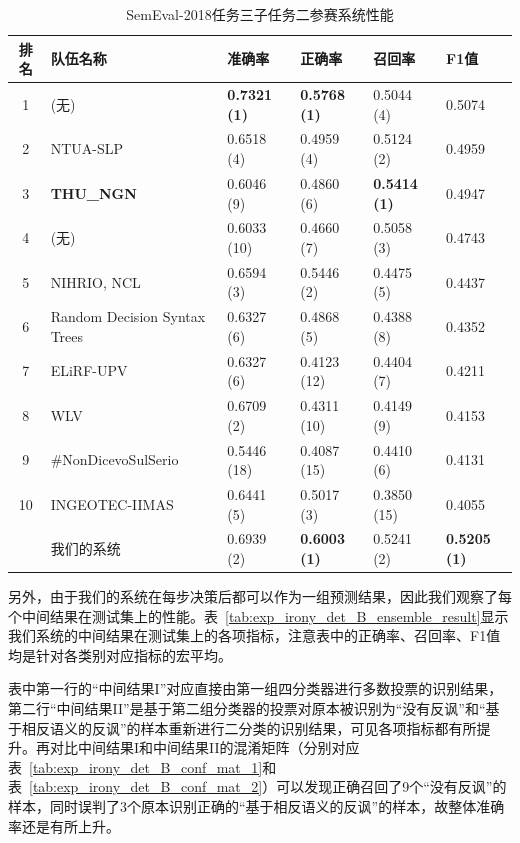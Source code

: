 \begin{table}[htb]
  \centering
  \begin{minipage}[t]{\linewidth}
  \caption{SemEval-2018任务三子任务二参赛系统性能} %
  \label{tab:exp_irony_det_B_other_comp}
    \begin{tabularx}{\linewidth}{c|X|llll}
    \toprule[1.5pt]
    排名 & 队伍名称 & 准确率 & 正确率 & 召回率 & F1值 \\
    \hline 
    1 & (无) & \bf 0.7321 (1) & \bf 0.5768 (1) & 0.5044 (4) & 0.5074 \\
    2 & NTUA-SLP & 0.6518 (4) & 0.4959 (4) & 0.5124 (2) & 0.4959 \\
    3 & \bf THU\_NGN & 0.6046 (9) & 0.4860 (6) & \bf 0.5414 (1) & 0.4947 \\
    4 & (无) & 0.6033 (10) & 0.4660 (7) & 0.5058 (3) & 0.4743 \\
    5 & NIHRIO, NCL & 0.6594 (3) & 0.5446 (2) & 0.4475 (5) & 0.4437 \\
    6 & Random Decision Syntax Trees & 0.6327 (6) & 0.4868 (5) & 0.4388 (8) & 0.4352 \\
    7 & ELiRF-UPV & 0.6327 (6) & 0.4123 (12) & 0.4404 (7) & 0.4211 \\
    8 & WLV & 0.6709 (2) & 0.4311 (10) & 0.4149 (9) & 0.4153 \\
    9 & \#NonDicevoSulSerio & 0.5446 (18) & 0.4087 (15) & 0.4410 (6) & 0.4131 \\
    10 & INGEOTEC-IIMAS & 0.6441 (5) & 0.5017 (3) & 0.3850 (15) & 0.4055 \\
    \hline
    & 我们的系统 & 0.6939 (2) & \bf 0.6003 (1) & 0.5241 (2) & \bf 0.5205 (1) \\
    \bottomrule[1.5pt]
    \end{tabularx}
  \end{minipage}
\end{table}

另外，由于我们的系统在每步决策后都可以作为一组预测结果，因此我们观察了每个中间结果在测试集上的性能。表~\ref{tab:exp_irony_det_B_ensemble_result}显示我们系统的中间结果在测试集上的各项指标，注意表中的正确率、召回率、F1值均是针对各类别对应指标的宏平均。

表中第一行的“中间结果I”对应直接由第一组四分类器进行多数投票的识别结果，第二行“中间结果II”是基于第二组分类器的投票对原本被识别为“没有反讽”和“基于相反语义的反讽”的样本重新进行二分类的识别结果，可见各项指标都有所提升。再对比中间结果I和中间结果II的混淆矩阵（分别对应表~\ref{tab:exp_irony_det_B_conf_mat_1}和表~\ref{tab:exp_irony_det_B_conf_mat_2}）可以发现正确召回了9个“没有反讽”的样本，同时误判了3个原本识别正确的“基于相反语义的反讽”的样本，故整体准确率还是有所上升。

